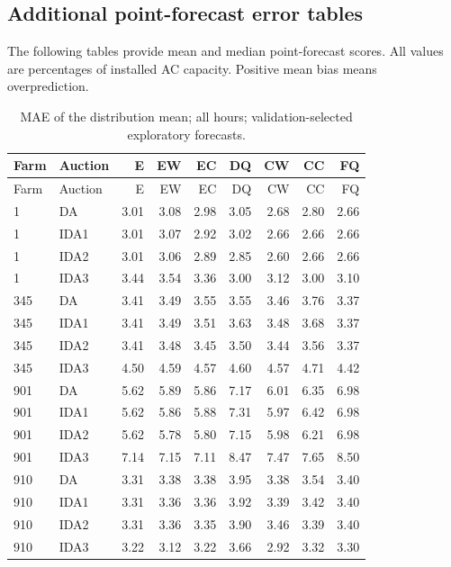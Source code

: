 \documentclass[11pt,a4paper]{article}
\begin{document}
\subsection{Additional point-forecast error tables}
The following tables provide mean and median point-forecast scores. All values are percentages of installed AC capacity. Positive mean bias means overprediction.
\small
\begin{longtable}{llrrrrrrr}
\caption{MAE of the distribution mean; all hours; validation-selected exploratory forecasts.}\\
\toprule Farm & Auction & E & EW & EC & DQ & CW & CC & FQ \\
\midrule\endfirsthead
\toprule Farm & Auction & E & EW & EC & DQ & CW & CC & FQ \\
\midrule\endhead
1 & DA & 3.01 & 3.08 & 2.98 & 3.05 & 2.68 & 2.80 & 2.66 \\
1 & IDA1 & 3.01 & 3.07 & 2.92 & 3.02 & 2.66 & 2.66 & 2.66 \\
1 & IDA2 & 3.01 & 3.06 & 2.89 & 2.85 & 2.60 & 2.66 & 2.66 \\
1 & IDA3 & 3.44 & 3.54 & 3.36 & 3.00 & 3.12 & 3.00 & 3.10 \\
\midrule
345 & DA & 3.41 & 3.49 & 3.55 & 3.55 & 3.46 & 3.76 & 3.37 \\
345 & IDA1 & 3.41 & 3.49 & 3.51 & 3.63 & 3.48 & 3.68 & 3.37 \\
345 & IDA2 & 3.41 & 3.48 & 3.45 & 3.50 & 3.44 & 3.56 & 3.37 \\
345 & IDA3 & 4.50 & 4.59 & 4.57 & 4.60 & 4.57 & 4.71 & 4.42 \\
\midrule
901 & DA & 5.62 & 5.89 & 5.86 & 7.17 & 6.01 & 6.35 & 6.98 \\
901 & IDA1 & 5.62 & 5.86 & 5.88 & 7.31 & 5.97 & 6.42 & 6.98 \\
901 & IDA2 & 5.62 & 5.78 & 5.80 & 7.15 & 5.98 & 6.21 & 6.98 \\
901 & IDA3 & 7.14 & 7.15 & 7.11 & 8.47 & 7.47 & 7.65 & 8.50 \\
\midrule
910 & DA & 3.31 & 3.38 & 3.38 & 3.95 & 3.38 & 3.54 & 3.40 \\
910 & IDA1 & 3.31 & 3.36 & 3.36 & 3.92 & 3.39 & 3.42 & 3.40 \\
910 & IDA2 & 3.31 & 3.36 & 3.35 & 3.90 & 3.46 & 3.39 & 3.40 \\
910 & IDA3 & 3.22 & 3.12 & 3.22 & 3.66 & 2.92 & 3.32 & 3.30 \\
\midrule
\bottomrule\end{longtable}
\normalsize
\small
\end{document}
